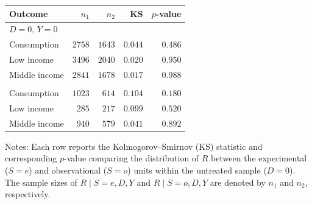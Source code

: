 \begin{threeparttable}
\begin{tabular}{lrrrr}
\toprule
Outcome & $n_1$ & $n_2$ & KS & $p$-value \\
\midrule
\multicolumn{5}{l}{$D=0,\, Y=0$}\\
\quad Consumption & $2758$ & $1643$ & $0.044$ & $0.486$ \\
\quad Low income & $3496$ & $2040$ & $0.020$ & $0.950$ \\
\quad Middle income & $2841$ & $1678$ & $0.017$ & $0.988$ \\
\addlinespace[0.6em]
\multicolumn{5}{l}{$D=0,\, Y=1$}\\
\quad Consumption & $1023$ & $614$ & $0.104$ & $0.180$ \\
\quad Low income & $285$ & $217$ & $0.099$ & $0.520$ \\
\quad Middle income & $940$ & $579$ & $0.041$ & $0.892$ \\
\bottomrule
\end{tabular}
\begin{tablenotes}[flushleft]
\small
\item Notes: Each row reports the Kolmogorov--Smirnov (KS) statistic and corresponding $p$-value comparing the distribution of $R$ between the experimental ($S=e$) and observational ($S=o$) units within the untreated sample ($D=0$). The sample sizes of $R \mid S=e, D, Y$ and $R \mid S=o, D, Y$ are denoted by $n_1$ and $n_2$, respectively.
\end{tablenotes}
\end{threeparttable}
